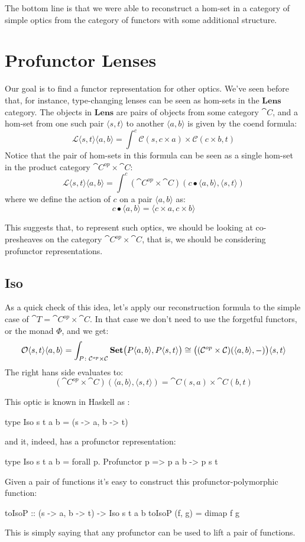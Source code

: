 \documentclass[DaoFP]{subfiles}
\begin{document}
The bottom line is that we were able to reconstruct a hom-set in a category of simple optics from the category of functors with some additional structure. 

\section{Profunctor Lenses}

Our goal is to find a functor representation for other optics. We've seen before that, for instance, type-changing lenses can be seen as hom-sets in the $\mathbf{Lens}$ category. The objects in $\mathbf{Lens}$ are pairs of objects from some category $\cat C$, and a hom-set from one such pair $\langle s, t \rangle$ to another  $\langle a, b \rangle$ is given by the coend formula:
\[ \mathcal{L}\langle s, t\rangle \langle a, b \rangle = \int^{c} \mathcal{C}(s, c \times a) \times  \mathcal{C}(c \times b, t) \]
Notice that the pair of hom-sets in this formula can be seen as a single hom-set in the product category $\cat C^{op} \times \cat C$:
\[  \mathcal{L}\langle s, t\rangle \langle a, b \rangle =  \int^{c} (\cat C^{op} \times \cat C )(c \bullet \langle a, b \rangle, \langle s, t \rangle)  \]
where we define the action of $c$ on a pair $\langle a, b \rangle$ as:
\[ c \bullet \langle a, b \rangle = \langle c \times a, c \times b \rangle \]

This suggests that, to represent such optics, we should be looking at co-presheaves on the category $\cat C^{op} \times \cat C$, that is, we should be considering profunctor representations. 

\subsection{Iso}
As a quick check of this idea, let's apply our reconstruction formula to the simple case of $\cat T = \cat C^{op} \times \cat C$. In that case we don't need to use the forgetful functors, or the monad $\Phi$, and we get:
\[  \mathcal{O}\langle s, t\rangle \langle a, b \rangle =\int_{P \colon \mathcal{C}^{op} \times \mathcal{C}} \mathbf{Set} \big(P \langle a, b\rangle, P \langle s, t\rangle \big) \cong \big( (\mathcal{C}^{op} \times \mathcal{C}) (\langle a, b\rangle ,-) \big) \langle s, t\rangle \]
The right hans side evaluates to:
\[ (\cat C^{op} \times \cat C) (\langle a, b\rangle , \langle s, t\rangle) = \cat C (s, a) \times \cat C (b, t) \]

This optic is known in Haskell as :
\begin{haskell}
type Iso s t a b = (s -> a, b -> t)
\end{haskell}
and it, indeed, has a profunctor representation:
\begin{haskell}
type Iso s t a b = forall p. Profunctor p => p a b -> p s t
\end{haskell}
Given a pair of functions it's easy to construct this profunctor-polymorphic function:
\begin{haskell}
toIsoP :: (s -> a, b -> t) -> Iso s t a b
toIsoP (f, g) = dimap f g
\end{haskell}
This is simply saying that any profunctor can be used to lift a pair of functions. 
\end{document}
